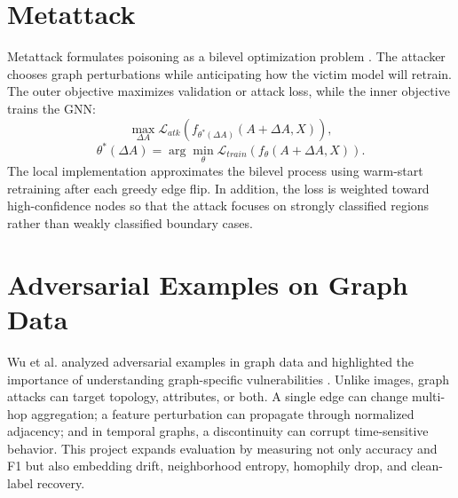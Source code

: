 \documentclass[12pt,oneside]{report}
\begin{document}
\section{Metattack}
Metattack formulates poisoning as a bilevel optimization problem \cite{zugner2019metattack}. The attacker chooses graph perturbations while anticipating how the victim model will retrain. The outer objective maximizes validation or attack loss, while the inner objective trains the GNN:
\begin{equation}
\max_{\Delta A} \mathcal{L}_{atk}\left(f_{\theta^*(\Delta A)}(A+\Delta A,X)\right),
\end{equation}
\begin{equation}
\theta^*(\Delta A)=\arg\min_\theta \mathcal{L}_{train}\left(f_\theta(A+\Delta A,X)\right).
\end{equation}
The local implementation approximates the bilevel process using warm-start retraining after each greedy edge flip. In addition, the loss is weighted toward high-confidence nodes so that the attack focuses on strongly classified regions rather than weakly classified boundary cases.

\section{Adversarial Examples on Graph Data}
Wu et al. analyzed adversarial examples in graph data and highlighted the importance of understanding graph-specific vulnerabilities \cite{wu2019adversarial}. Unlike images, graph attacks can target topology, attributes, or both. A single edge can change multi-hop aggregation; a feature perturbation can propagate through normalized adjacency; and in temporal graphs, a discontinuity can corrupt time-sensitive behavior. This project expands evaluation by measuring not only accuracy and F1 but also embedding drift, neighborhood entropy, homophily drop, and clean-label recovery.
\end{document}
